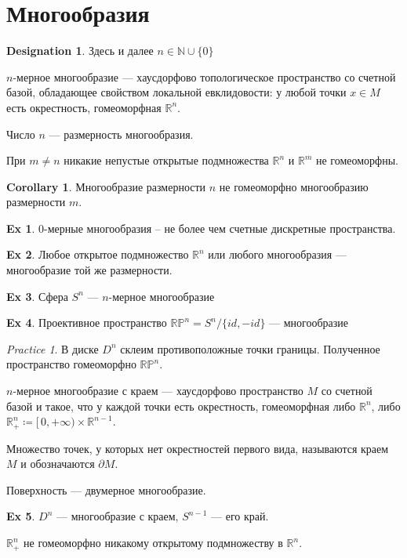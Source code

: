 \documentclass[11pt]{book}
\newcommand{\N}{\mathbb{N}}
\newcommand{\R}{\mathbb{R}}
\newcommand{\Pm}{\mathbb{P}}
\theoremstyle{definition}
\theoremstyle{plain}
\theoremstyle{plain}
\theoremstyle{definition}
\newtheorem*{ex}{Ex}
\newtheorem*{cor}{Corollary}
\newtheorem*{name}{Designation}
\theoremstyle{remark}
\newtheorem*{prac}{Practice}
\begin{document}
\section{Многообразия}
\begin{name}
    Здесь и далее $ n \in \N \cup \{0\}$
\end{name}
\begin{defn}
    {\sf $ n$-мерное многообразие} --- хаусдорфово топологическое пространство со счетной базой, обладающее свойством локальной евклидовости: у любой точки $ x \in M$ есть окрестность, гомеоморфная  $ \R^{n}$.

    Число $ n$ --- размерность многообразия.
\end{defn}
\begin{thm}
    При $ m \ne n$ никакие непустые открытые подмножества $ \R^{n}$ и $ \R^{m}$ не гомеоморфны.
\end{thm}
\begin{cor}
    Многообразие размерности $ n$ не гомеоморфно многообразию размерности $ m$.
\end{cor}
\begin{ex}
    $ 0$-мерные многообразия -- не более чем счетные дискретные пространства.
\end{ex}
\begin{ex}
    Любое открытое подмножество $ \R^{n}$ или любого многообразия --- многообразие той же размерности.
\end{ex}
\begin{ex}
    Сфера $ S^{n}$ --- $ n$-мерное многообразие
\end{ex}
\begin{ex}
    Проективное пространство $ \R \Pm^{n} = S^{n}/\{id, -id\}$ --- многообразие
\end{ex}
\begin{prac}
    В диске $ D^{n}$ склеим противоположные точки границы. Полученное пространство гомеоморфно $ \R \Pm^{n}$.
\end{prac}
\begin{defn}
    {\sf $ n$-мерное многообразие с краем} --- хаусдорфово пространство $ M$ со счетной базой и такое, что у каждой точки есть окрестность, гомеоморфная либо  $ \R^{n}$, либо $ \R^{n}_+ \coloneqq [\,0, +\infty) \times \R^{n-1} $.

    Множество точек, у которых нет окрестностей первого вида, называются {\sf краем} $ M$ и обозначаются $\partial M$.
\end{defn}
\begin{defn}
    {\sf Поверхность} --- двумерное многообразие.
\end{defn}
\begin{ex}
    $ D^{n}$ --- многообразие с краем, $ S^{n-1}$ --- его край.
\end{ex}
\begin{thm}
    $ \R^{n} _{+}$ не гомеоморфно никакому открытому подмножеству в $ \R^{n} $.
\end{thm}
\end{document}
